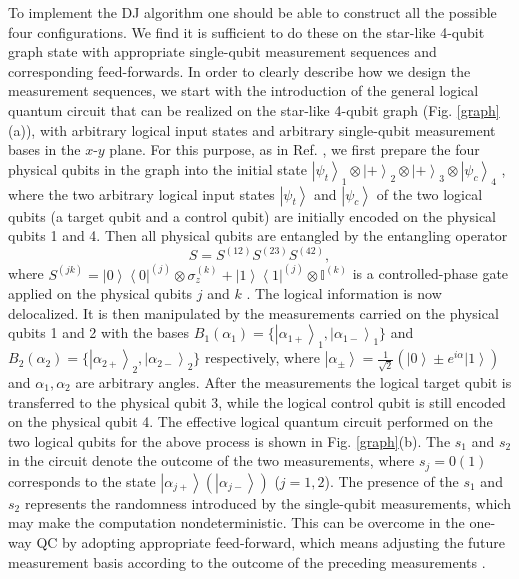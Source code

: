 \documentclass[showpacs,superscriptaddress,twocolumn,prl]{revtex4}
\begin{document}
To implement the DJ algorithm one should be able to construct all the
possible four configurations. We find it is sufficient to do these on the
star-like 4-qubit graph state with appropriate single-qubit measurement
sequences and corresponding feed-forwards. In order to clearly describe how
we design the measurement sequences, we start with the introduction of the
general logical quantum circuit that can be realized on the star-like
4-qubit graph (Fig. \ref{graph}(a)), with arbitrary logical input states and
arbitrary single-qubit measurement bases in the $x$-$y$ plane. For this
purpose, as in Ref. \cite{onewayPRL}, we first prepare the four physical
qubits in the graph into the initial state $\left\vert \psi
_{t}\right\rangle _{1}\otimes \left\vert +\right\rangle _{2}\otimes
\left\vert +\right\rangle _{3}\otimes \left\vert \psi _{c}\right\rangle _{4}$%
, where the two arbitrary logical input states $\left\vert \psi
_{t}\right\rangle $ and $\left\vert \psi _{c}\right\rangle $ of the two
logical qubits \cite{logicqubit} (a target qubit and a control qubit) are
initially encoded on the physical qubits 1 and 4. Then all physical qubits
are entangled by the entangling operator%
\begin{equation}
S=S^{(12)}S^{(23)}S^{(42)},  \label{etangling}
\end{equation}%
where $S^{(jk)}=\left\vert 0\right\rangle \left\langle 0\right\vert
^{(j)}\otimes \sigma _{z}^{(k)}+\left\vert 1\right\rangle \left\langle
1\right\vert ^{(j)}\otimes \mathbb{I}^{(k)}$ is a controlled-phase gate
applied on the physical qubits $j$ and $k$ \cite{cphase}. The logical
information is now delocalized. It is then manipulated by the measurements
carried on the physical qubits 1 and 2 with the bases $B_{1}(\alpha
_{1})=\{\left\vert \alpha _{1+}\right\rangle _{1},\left\vert \alpha
_{1-}\right\rangle _{1}\}$ and $B_{2}(\alpha _{2})=\{\left\vert \alpha
_{2+}\right\rangle _{2},\left\vert \alpha _{2-}\right\rangle _{2}\}$
respectively, where $\left\vert \alpha _{\pm }\right\rangle =\frac{1}{\sqrt{2%
}}(\left\vert 0\right\rangle \pm e^{i\alpha }\left\vert 1\right\rangle )$
and $\alpha _{1},\alpha _{2}$ are arbitrary angles. After the measurements
the logical target qubit is transferred to the physical qubit 3, while the
logical control qubit is still encoded on the physical qubit 4. The
effective logical quantum circuit performed on the two logical qubits for
the above process is shown in Fig. \ref{graph}(b). The $s_{1}$ and $s_{2}$
in the circuit denote the outcome of the two measurements, where $s_{j}=0(1)$
corresponds to the state $\left\vert \alpha _{j+}\right\rangle (\left\vert
\alpha _{j-}\right\rangle )$ ($j=1,2$). The presence of the $s_{1}$ and $%
s_{2}$ represents the randomness introduced by the single-qubit
measurements, which may make the computation nondeterministic. This can be
overcome in the one-way QC by adopting appropriate feed-forward, which means
adjusting the future measurement basis according to the outcome of the
preceding measurements \cite{onewayPRL}.
\end{document}
